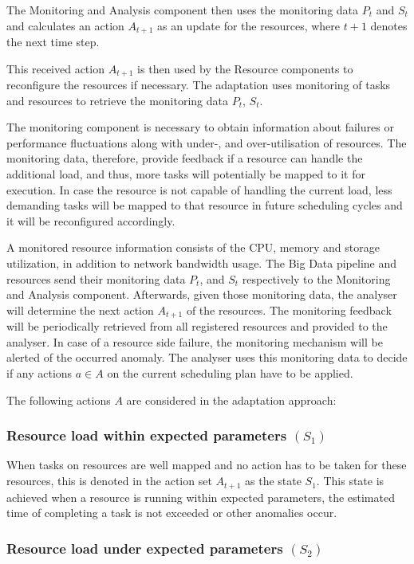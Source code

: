  The Monitoring and Analysis component then uses the monitoring data $P_t$ and $S_t$ and calculates an action $A_{t+1}$ as an update for the resources, where $t+1$ denotes the next time step.
    
  This received action $A_{t+1}$ is then used by the Resource components to reconfigure the resources if necessary.
  The adaptation uses monitoring of tasks and resources to retrieve the monitoring data $P_t$, $S_t$.
            
  The monitoring component is necessary to obtain information about failures or performance fluctuations along with under-, and over-utilisation of resources.
  The monitoring data, therefore, provide feedback if a resource can handle the additional load, and thus, more tasks will potentially be mapped to it for execution. 
  In case the resource is not capable of handling the current load, less demanding tasks will be mapped to that resource in future scheduling cycles and it will be reconfigured accordingly.

  A monitored resource information consists of the CPU, memory and storage utilization, in addition to network bandwidth usage.
  The Big Data pipeline and resources send their monitoring data $P_t$, and $S_t$ respectively to the Monitoring and Analysis component.
  Afterwards, given those monitoring data, the analyser will determine the next action $A_{t+1}$ of the resources.
  The monitoring feedback will be periodically retrieved from all registered resources and provided to the analyser.
  In case of a resource side failure, the monitoring mechanism will be alerted of the occurred anomaly.  
  The analyser uses this monitoring data to decide if any actions $a \in A$ on the current scheduling plan have to be applied.

  The following actions $A$ are considered in the adaptation approach:

  \subsubsection*{Resource load within expected parameters $(S_1)$} 

  When tasks on resources are well mapped and no action has to be taken for these resources, this is denoted in the action set $A_{t+1}$ as the state $S_1$. This state is achieved when a resource is running within expected parameters, the estimated time of completing a task is not exceeded or other anomalies occur.

  \subsubsection*{Resource load under expected parameters $(S_2)$}

